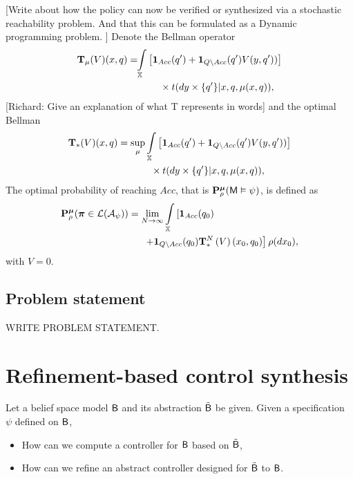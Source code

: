 \documentclass{ifacconf}
\newcommand{\red}[1]{{\color{red} #1}}
\begin{document}

\red{[Write about how the policy can now be verified or synthesized via a stochastic reachability problem. And that this can be formulated as a Dynamic programming problem.  ]}
Denote the Bellman operator
\begin{align}\label{eq:V_recopt_inf}
& \Bel_\pol (V)(x,q) =\!\!\int_{\bar\X}  \left[\mathbf 1_{Acc}(q')+  \mathbf 1_{Q\setminus Acc}( q')V( y, q'))\right]\notag\\&\hspace{3cm}\hfill 
\times \bar{\tr}(d y\times\{q'\}|x,q,\pol(x,q)),
\end{align}
\red{[Richard: Give an explanation of what T represents in words]}
and the optimal Bellman 
\begin{align}\label{eq:V_recopt_inf}
& \Bel_\ast (V)(x,q) =\sup_\pol\int_{\X}\left[\mathbf 1_{Acc}( q')+  \mathbf 1_{Q\setminus Acc}(q')V(y,q'))\right]\notag\\&\hspace{3cm}\hfill\times \bar{\tr}(d y\times\{q'\}|x,q,\pol(x,q)),
\end{align}
The optimal probability of reaching $Acc $, that is $\mathbf{P}_\rho^{\boldsymbol{\mu}}(\mathsf{M}\vDash\psi) $, is defined as
\begin{align*}
&\P_\init^\polb
(\word \in\mathcal L(\mathcal A_\psi))= 	\lim_{N\rightarrow \infty}\int_{\bar{\X}}\left[\mathbf 1_{Acc}( q_0)\right.\\ &\hspace{3cm} \left.+ \mathbf 1_{Q\setminus Acc}(q_0) \Bel^N_\ast\left( V\right)(x_0,q_0)\right] {\init} (d \bar x_0),
\end{align*}
with $V=0$.


\subsection{Problem statement}
\red{WRITE PROBLEM STATEMENT.}
\section{Refinement-based control synthesis} \label{sec:refinement}
 Let a belief space model $\mathsf{B}$ and its abstraction $\tilde {\mathsf{B}}$ be given.  Given a specification $\psi$ defined on $\mathsf{B}$,  \begin{itemize}
	\item How can we compute a controller for $\mathsf{B}$ based on $\tilde {\mathsf{B}}$,
	\item How can we refine an abstract controller designed for $\tilde{\mathsf{B}}$ to $\mathsf{B}$.
\end{itemize}
\end{document}
